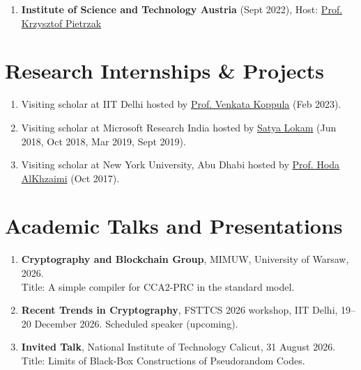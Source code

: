 \documentclass[margin]{res} %
\begin{document}
\begin{resume}
\begin{enumerate}
    \item \textbf{Institute of Science and Technology Austria} (Sept 2022), Host: \href{https://scholar.google.com/citations?user=uEjyGZUAAAAJ&hl=en}{Prof. Krzysztof Pietrzak}
\end{enumerate}

\section{Research Internships \& Projects}

\begin{enumerate}
    \item Visiting scholar at IIT Delhi hosted by \href{https://web.iitd.ac.in/~kvenkata/}{Prof. Venkata Koppula} (Feb 2023).

    \item Visiting scholar at Microsoft Research India hosted by \href{https://www.microsoft.com/en-us/research/people/satya/}{Satya Lokam} (Jun 2018, Oct 2018, Mar 2019, Sept 2019).
    
    \item Visiting scholar at New York University, Abu Dhabi hosted by \href{https://nyuad.nyu.edu/en/academics/divisions/engineering/faculty/hoda-al-khzaimi.html}{Prof. Hoda AlKhzaimi} (Oct 2017).
    
\end{enumerate}


\section{Academic Talks and Presentations}

\begin{enumerate}
    \item \textbf{Cryptography and Blockchain Group}, MIMUW, University of Warsaw, 2026.\\
    Title: A simple compiler for CCA2-PRC in the standard model.

    \item \textbf{Recent Trends in Cryptography}, FSTTCS 2026 workshop, IIT Delhi, 19--20 December 2026. Scheduled speaker (upcoming).

    \item \textbf{Invited Talk}, National Institute of Technology Calicut, 31 August 2026.\\
    Title: Limits of Black-Box Constructions of Pseudorandom Codes.


\end{enumerate}
\end{resume}
\end{document}
